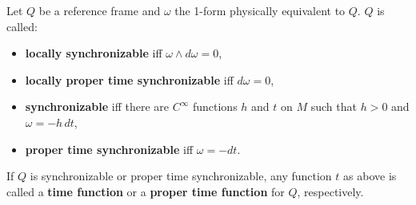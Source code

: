 Let $Q$ be a reference frame and $\omega$ the 1-form physically equivalent to $Q$. $Q$ is called:
\begin{itemize}
  \item \textbf{locally synchronizable} iff $\omega \wedge d\omega = 0$,
  \item \textbf{locally proper time synchronizable} iff $d\omega = 0$,
  \item \textbf{synchronizable} iff there are $C^\infty$ functions $h$ and $t$ on $M$ such that $h > 0$ and $\omega = -h\,dt$,
  \item \textbf{proper time synchronizable} iff $\omega = -dt$.
\end{itemize}
If $Q$ is synchronizable or proper time synchronizable, any function $t$ as above is called a \textbf{time function} or a \textbf{proper time function} for $Q$, respectively.
